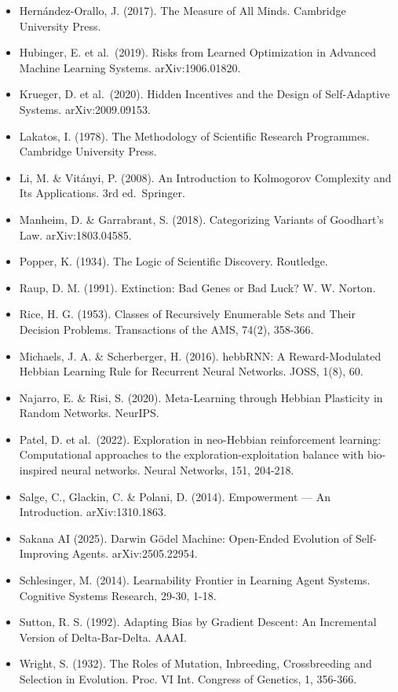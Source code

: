 \documentclass[
  11pt,
]{article}
\begin{document}
\begin{itemize}
\item
  Hernández-Orallo, J. (2017). The Measure of All Minds. Cambridge
  University Press.
\item
  Hubinger, E. et al.~(2019). Risks from Learned Optimization in
  Advanced Machine Learning Systems. arXiv:1906.01820.
\item
  Krueger, D. et al.~(2020). Hidden Incentives and the Design of
  Self-Adaptive Systems. arXiv:2009.09153.
\item
  Lakatos, I. (1978). The Methodology of Scientific Research Programmes.
  Cambridge University Press.
\item
  Li, M. \& Vitányi, P. (2008). An Introduction to Kolmogorov Complexity
  and Its Applications. 3rd ed.~Springer.
\item
  Manheim, D. \& Garrabrant, S. (2018). Categorizing Variants of
  Goodhart's Law. arXiv:1803.04585.
\item
  Popper, K. (1934). The Logic of Scientific Discovery. Routledge.
\item
  Raup, D. M. (1991). Extinction: Bad Genes or Bad Luck? W. W. Norton.
\item
  Rice, H. G. (1953). Classes of Recursively Enumerable Sets and Their
  Decision Problems. Transactions of the AMS, 74(2), 358-366.
\item
  Michaels, J. A. \& Scherberger, H. (2016). hebbRNN: A Reward-Modulated
  Hebbian Learning Rule for Recurrent Neural Networks. JOSS, 1(8), 60.
\item
  Najarro, E. \& Risi, S. (2020). Meta-Learning through Hebbian
  Plasticity in Random Networks. NeurIPS.
\item
  Patel, D. et al.~(2022). Exploration in neo-Hebbian reinforcement
  learning: Computational approaches to the exploration-exploitation
  balance with bio-inspired neural networks. Neural Networks, 151,
  204-218.
\item
  Salge, C., Glackin, C. \& Polani, D. (2014). Empowerment --- An
  Introduction. arXiv:1310.1863.
\item
  Sakana AI (2025). Darwin Gödel Machine: Open-Ended Evolution of
  Self-Improving Agents. arXiv:2505.22954.
\item
  Schlesinger, M. (2014). Learnability Frontier in Learning Agent
  Systems. Cognitive Systems Research, 29-30, 1-18.
\item
  Sutton, R. S. (1992). Adapting Bias by Gradient Descent: An
  Incremental Version of Delta-Bar-Delta. AAAI.
\item
  Wright, S. (1932). The Roles of Mutation, Inbreeding, Crossbreeding
  and Selection in Evolution. Proc. VI Int. Congress of Genetics, 1,
  356-366.
\end{itemize}
\end{document}
